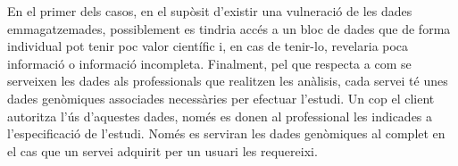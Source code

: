 \newline En el primer dels casos, en el supòsit d'existir una vulneració de les dades emmagatzemades, possiblement es tindria accés a un bloc de dades que de forma individual pot tenir poc valor científic i, en cas de tenir-lo, revelaria poca informació o informació incompleta.
\newline Finalment, pel que respecta a com se serveixen les dades als professionals que realitzen les anàlisis, cada servei té unes dades genòmiques associades necessàries per efectuar l'estudi. Un cop el client autoritza l'ús d'aquestes dades, només es donen al professional
les indicades a l'especificació de l'estudi. Només es serviran les dades genòmiques al complet en el cas que un servei adquirit per un usuari les requereixi.

